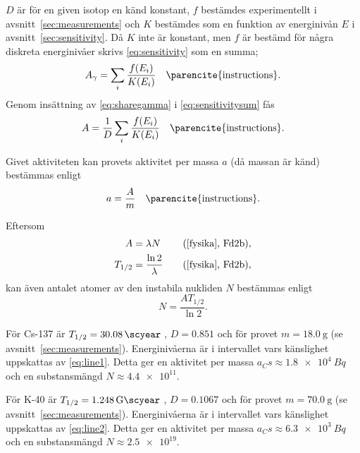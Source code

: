 $D$ är för en given isotop en känd konstant, $f$ bestämdes experimentellt
i avsnitt~\ref{sec:measurements} och $K$ bestämdes som en funktion av
energinivån $E$ i avsnitt~\ref{sec:sensitivity}. Då $K$ inte är konstant, men
$f$ är bestämd för några diskreta energinivåer skrivs \eqref{eq:sensitivity}
som en summa;
%
\begin{equation}
    A_\gamma = \sum_i \frac{f(E_i)}{K(E_i)} \quad \text{\parencite{instructions}} \label{eq:sensitivitysum}.
\end{equation}
%
Genom insättning av \eqref{eq:sharegamma} i \eqref{eq:sensitivitysum} fås
%
\begin{equation}
    A = \frac{1}{D} \sum_i \frac{f(E_i)}{K(E_i)} \quad \text{\parencite{instructions}} \label{eq:activitysum}.
\end{equation}

Givet aktiviteten kan provets aktivitet per massa $a$ (då massan är känd)
bestämmas enligt
%
\begin{equation}
    a = \frac{A}{m} \quad \text{\parencite{instructions}} \label{eq:apm}.
\end{equation}

Eftersom
%
\begin{align}
    A       &= \lambda N             &\quad \fysika{Fd2b} \label{eq:activity}, \\
    T_{1/2} &= \frac{\ln 2}{\lambda} &\quad \fysika{Fd2b} \label{eq:halflife},
\end{align}
%
kan även antalet atomer av den instabila nukliden $N$ bestämmas enligt
%
\begin{equation}
    N = \frac{A T_{1/2}}{\ln 2} \label{eq:substance}.
\end{equation}

För Cs-137 är $T_{1/2} = \qty{30.08}{\scyear}$ ,
$D = \num{0.851}$ \parencite{instructions} och för provet $m = \qty{18.0}{\g}$
(se avsnitt~\ref{sec:measurements}). Energinivåerna är i intervallet vars
känslighet uppskattas av \eqref{eq:line1}. Detta ger en aktivitet per massa
$a_Cs \approx \qty{1.8e4}{Bq}$ och en substansmängd $N \approx \num{4.4e11}$.

För K-40 är $T_{1/2} = \qty{1.248}{\giga\scyear}$ ,
$D = \num{0.1067}$ \parencite{instructions} och för provet $m = \qty{70.0}{\g}$
(se avsnitt~\ref{sec:measurements}). Energinivåerna är i intervallet vars
känslighet uppskattas av \eqref{eq:line2}. Detta ger en aktivitet per massa
$a_Cs \approx \qty{6.3e3}{Bq}$ och en substansmängd $N \approx \num{2.5e19}$.

